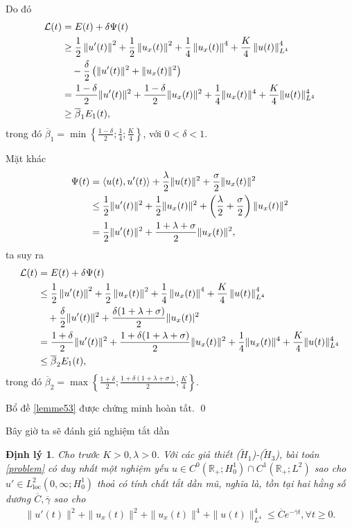 \documentclass[12pt,a4paper]{article}
\def\R{\mathbb{R}}
\newtheorem{theorem}{Định lý}[section]
\theoremstyle{definition}
\theoremstyle{definition}
\begin{document}
Do đó
\begin{align}
    \mathcal{L}(t) &= E(t) + \delta \Psi(t) \\
    &\ge \frac{1}{2} \left\|u'(t)\right\|^2 + \frac{1}{2} \left\|u_x(t)\right\|^2 + \frac{1}{4} \left\|u_x(t)\right\|^4 + \frac{K}{4}\left\|u(t)\right\|^4_{L^4} \notag \\
    &\quad - \frac{\delta}{2} \left( \|u'(t)\|^2 + \|u_x(t)\|^2\right) \notag \\
    &= \frac{1-\delta}{2} \|u'(t)\|^2 + \frac{1-\delta}{2} \|u_x(t)\|^2 + \frac{1}{4} \|u_x(t)\|^4 + \frac{K}{4} \|u(t)\|^4_{L^4} \notag \\
    &\ge \overline{\beta}_1 E_1(t), \notag
\end{align}
trong đó $\displaystyle \overline{\beta}_1 = \min \left\{\frac{1-\delta}{2}; \frac{1}{4}; \frac{K}{4}\right\}$, với $0 < \delta < 1$.

Mặt khác
\begin{align}
    \Psi(t) &= \left<u(t),u'(t)\right> + \frac{\lambda}{2} \|u(t)\|^2 + \frac{\sigma}{2} \|u_x(t)\|^2 \\
    &\le \frac{1}{2} \|u'(t)\|^2 + \frac{1}{2} \|u_x(t)\|^2 + \left(\frac{\lambda}{2} + \frac{\sigma}{2}\right) \|u_x(t)\|^2 \notag \\
    &= \frac{1}{2} \|u'(t)\|^2 + \frac{1 + \lambda + \sigma}{2} \|u_x(t)\|^2, \notag
\end{align}
ta suy ra
\begin{align}
    \mathcal{L}(t) &= E(t) + \delta \Psi(t) \\
    &\le \frac{1}{2} \left\|u'(t)\right\|^2 + \frac{1}{2} \left\|u_x(t)\right\|^2 + \frac{1}{4} \left\|u_x(t)\right\|^4 + \frac{K}{4}\left\|u(t)\right\|^4_{L^4} \notag \\
    &\quad + \frac{\delta}{2}\|u'(t)\|^2 + \frac{\delta(1 + \lambda + \sigma)}{2} \|u_x(t)|^2 \notag \\
    &= \frac{1+\delta}{2} \|u'(t)\|^2 + \frac{1+\delta(1+\lambda+\sigma)}{2}\|u_x(t)\|^2 + \frac{1}{4}\|u_x(t)\|^4 + \frac{K}{4}\|u(t)\|^4_{L^4} \notag \\
    &\le \overline{\beta}_2 E_1(t), \notag
\end{align}
trong đó $\displaystyle \overline{\beta}_2 = \max \left\{\frac{1+\delta}{2}; \frac{1+\delta(1+\lambda+\sigma)}{2}; \frac{K}{4}\right\}$.

Bổ đề \ref{lemme53} được chứng minh hoàn tất. \qed

Bây giờ ta sẽ đánh giá nghiệm tắt dần
\begin{theorem} \label{theorem54}
    Cho trước $K > 0, \lambda > 0$. Với các giả thiết ($\tilde{H}_1$)-($\tilde{H}_3$), bài toán \eqref{problem} có duy nhất một nghiệm yếu $u \in C^0(\R_+;H^1_0) \cap C^1(\R_+;L^2)$ sao cho $u' \in L^2_{\text{loc}}(0,\infty;H^1_0)$ thoả có tính chất tắt dần mũ, nghĩa là, tồn tại hai hằng số dương $\overline{C}, \overline{\gamma}$ sao cho
    \begin{align}
        \|u'(t)\|^2 + \|u_x(t)\|^2 + \|u_x(t)\|^4 + \|u(t)\|^4_{L^4} \le \overline{C} e^{-\overline{\gamma}t}, \forall t \ge 0.
    \end{align}
\end{theorem}
\end{document}
